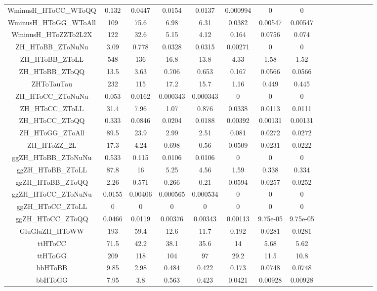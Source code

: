 \begin{table}
\begin{adjustbox}{max width=\textwidth}
\begin{tabular}{  c c c c c c c c c c c c cccc}
WminusH\_HToCC\_WToQQ & 0.132 & 0.0447 & 0.0154 & 0.0137 & 0.000994 & 0 & 0 \\ 
WminusH\_HToGG\_WToAll & 109 & 75.6 & 6.98 & 6.31 & 0.0382 & 0.00547 & 0.00547 \\ 
WminusH\_HToZZTo2L2X & 122 & 32.6 & 5.15 & 4.12 & 0.164 & 0.0756 & 0.074 \\ 
\hline 
ZH\_HToBB\_ZToNuNu & 3.09 & 0.778 & 0.0328 & 0.0315 & 0.00271 & 0 & 0 \\ 
ZH\_HToBB\_ZToLL & 548 & 136 & 16.8 & 13.8 & 4.33 & 1.58 & 1.52 \\ 
ZH\_HToBB\_ZToQQ & 13.5 & 3.63 & 0.706 & 0.653 & 0.167 & 0.0566 & 0.0566 \\ 
ZHToTauTau & 232 & 115 & 17.2 & 15.7 & 1.16 & 0.449 & 0.445 \\ 
ZH\_HToCC\_ZToNuNu & 0.053 & 0.0162 & 0.000343 & 0.000343 & 0 & 0 & 0 \\ 
ZH\_HToCC\_ZToLL & 31.4 & 7.96 & 1.07 & 0.876 & 0.0338 & 0.0113 & 0.0111 \\ 
ZH\_HToCC\_ZToQQ & 0.333 & 0.0846 & 0.0204 & 0.0188 & 0.00392 & 0.00131 & 0.00131 \\ 
ZH\_HToGG\_ZToAll & 89.5 & 23.9 & 2.99 & 2.51 & 0.081 & 0.0272 & 0.0272 \\ 
ZH\_HToZZ\_2L & 17.3 & 4.24 & 0.698 & 0.56 & 0.0509 & 0.0231 & 0.0222 \\ 
\hline 
ggZH\_HToBB\_ZToNuNu & 0.533 & 0.115 & 0.0106 & 0.0106 & 0 & 0 & 0 \\ 
ggZH\_HToBB\_ZToLL & 87.8 & 16 & 5.25 & 4.56 & 1.59 & 0.338 & 0.334 \\ 
ggZH\_HToBB\_ZToQQ & 2.26 & 0.571 & 0.266 & 0.21 & 0.0594 & 0.0257 & 0.0252 \\ 
ggZH\_HToCC\_ZToNuNu & 0.0155 & 0.00406 & 0.000565 & 0.000534 & 0 & 0 & 0 \\ 
ggZH\_HToCC\_ZToLL & 0 & 0 & 0 & 0 & 0 & 0 & 0 \\ 
ggZH\_HToCC\_ZToQQ & 0.0466 & 0.0119 & 0.00376 & 0.00343 & 0.00113 & 9.75e-05 & 9.75e-05 \\ 
GluGluZH\_HToWW & 193 & 59.4 & 12.6 & 11.7 & 0.192 & 0.0281 & 0.0281 \\ 
\hline 
ttHToCC & 71.5 & 42.2 & 38.1 & 35.6 & 14 & 5.68 & 5.62 \\ 
ttHToGG & 209 & 118 & 104 & 97 & 29.2 & 11.5 & 10.8 \\ 
\hline 
bbHToBB & 9.85 & 2.98 & 0.484 & 0.422 & 0.173 & 0.0748 & 0.0748 \\ 
bbHToGG & 7.95 & 3.8 & 0.563 & 0.423 & 0.0421 & 0.00928 & 0.00928 \\ 

\end{tabular}
\end{adjustbox}
\end{table}
